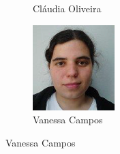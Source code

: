 \documentclass[11pt, a4paper, oneside]{article}
\begin{document}
\begin{figure}[h!]
\begin{subfigure}{.33\textwidth}
  \caption{Cláudia Oliveira}
\end{subfigure}%
\begin{subfigure}{.33\textwidth}
  \centering
  \includegraphics[width=0.8\linewidth]{107}
  \caption{Vanessa Campos}
\end{subfigure}%
\end{figure}
\end{document}
